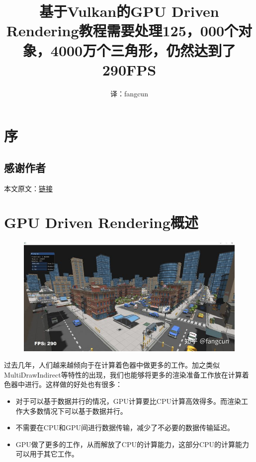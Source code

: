 \documentclass{ctexart}
\title{基于Vulkan的GPU Driven Rendering教程}
\author{译：fangcun}
\begin{document}
\maketitle
\newpage
\setcounter{tocdepth}{3}
\tableofcontents

\newpage
\section{序}

\subsection{感谢作者}

本文原文：\href{https://vkguide.dev/docs/gpudriven}{链接}

\newpage
\section{GPU Driven Rendering概述}

\begin{figure}[H]
	\title{需要处理125，000个对象，4000万个三角形，仍然达到了290FPS}
	\centering
	\includegraphics[scale=0.5]{img/1-1.jpg}
\end{figure}


过去几年，人们越来越倾向于在计算着色器中做更多的工作。加之类似MultiDrawIndirect等特性的出现，我们也能够将更多的渲染准备工作放在计算着色器中进行。这样做的好处也有很多：

\begin{itemize}
	\item 对于可以基于数据并行的情况，GPU计算要比CPU计算高效得多。而渲染工作大多数情况下可以基于数据并行。
	\item 不需要在CPU和GPU间进行数据传输，减少了不必要的数据传输延迟。
	\item GPU做了更多的工作，从而解放了CPU的计算能力，这部分CPU的计算能力可以用于其它工作。
\end{itemize}
\end{document}
